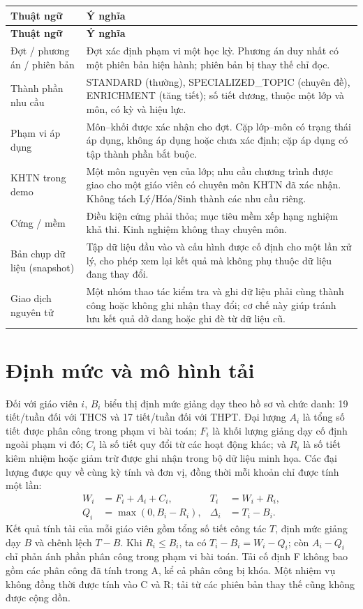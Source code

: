 \documentclass[12pt,a4paper]{report}
\begin{document}
\begin{longtable}{|p{3.4cm}|p{10.5cm}|}
\hline
\textbf{Thuật ngữ} & \textbf{Ý nghĩa} \\\hline
\endfirsthead
\hline
\textbf{Thuật ngữ} & \textbf{Ý nghĩa} \\\hline
\endhead
Đợt / phương án / phiên bản & Đợt xác định phạm vi một học kỳ. Phương án duy nhất có một phiên bản hiện hành; phiên bản bị thay thế chỉ đọc. \\\hline
Thành phần nhu cầu & STANDARD (thường), SPECIALIZED\_TOPIC (chuyên đề), ENRICHMENT (tăng tiết); số tiết dương, thuộc một lớp và môn, có kỳ và hiệu lực. \\\hline
Phạm vi áp dụng & Môn--khối được xác nhận cho đợt. Cặp lớp--môn có trạng thái áp dụng, không áp dụng hoặc chưa xác định; cặp áp dụng có tập thành phần bắt buộc. \\\hline
KHTN trong demo & Một môn nguyên vẹn của lớp; nhu cầu chương trình được giao cho một giáo viên có chuyên môn KHTN đã xác nhận. Không tách Lý/Hóa/Sinh thành các nhu cầu riêng. \\\hline
Cứng / mềm & Điều kiện cứng phải thỏa; mục tiêu mềm xếp hạng nghiệm khả thi. Kinh nghiệm không thay chuyên môn. \\\hline
Bản chụp dữ liệu (snapshot) & Tập dữ liệu đầu vào và cấu hình được cố định cho một lần xử lý, cho phép xem lại kết quả mà không phụ thuộc dữ liệu đang thay đổi. \\\hline
Giao dịch nguyên tử & Một nhóm thao tác kiểm tra và ghi dữ liệu phải cùng thành công hoặc không ghi nhận thay đổi; cơ chế này giúp tránh lưu kết quả dở dang hoặc ghi đè từ dữ liệu cũ. \\\hline
\end{longtable}


\section{Định mức và mô hình tải}\label{sec:workload}
Đối với giáo viên $i$, $B_i$ biểu thị định mức giảng dạy theo hồ sơ và chức danh: 19 tiết/tuần đối với THCS và 17 tiết/tuần đối với THPT. Đại lượng $A_i$ là tổng số tiết được phân công trong phạm vi bài toán; $F_i$ là khối lượng giảng dạy cố định ngoài phạm vi đó; $C_i$ là số tiết quy đổi từ các hoạt động khác; và $R_i$ là số tiết kiêm nhiệm hoặc giảm trừ được ghi nhận trong bộ dữ liệu minh họa. Các đại lượng được quy về cùng kỳ tính và đơn vị, đồng thời mỗi khoản chỉ được tính một lần:
\begin{equation}\label{eq:workload}
\begin{aligned}
W_i&=F_i+A_i+C_i, & T_i&=W_i+R_i,\\
Q_i&=\max(0,B_i-R_i), & \Delta_i&=T_i-B_i.
\end{aligned}
\end{equation}
Kết quả tính tải của mỗi giáo viên gồm tổng số tiết công tác $T$, định mức giảng dạy $B$ và chênh lệch $T-B$. Khi $R_i\le B_i$, ta có $T_i-B_i=W_i-Q_i$; còn $A_i-Q_i$ chỉ phản ánh phần phân công trong phạm vi bài toán. Tải cố định F không bao gồm các phân công đã tính trong A, kể cả phân công bị khóa. Một nhiệm vụ không đồng thời được tính vào C và R; tải từ các phiên bản thay thế cũng không được cộng dồn.
\end{document}
